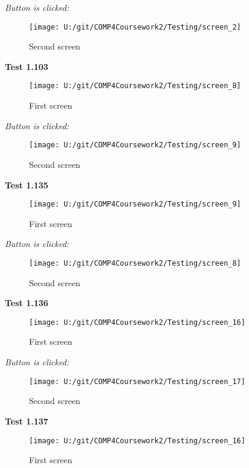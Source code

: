 \textit{Button is clicked: }

\begin{figure}[H]
    \label{fig: Second Screen}\caption{Second screen}
    \texttt{[image: U:/git/COMP4Coursework2/Testing/screen\_2]}
\end{figure}

\textbf{Test 1.103}

\begin{figure}[H]
    \label{fig: First Screen}\caption{First screen}
    \texttt{[image: U:/git/COMP4Coursework2/Testing/screen\_8]}
\end{figure}

\textit{Button is clicked: }

\begin{figure}[H]
    \label{fig: Second Screen}\caption{Second screen}
    \texttt{[image: U:/git/COMP4Coursework2/Testing/screen\_9]}
\end{figure}

\textbf{Test 1.135}

\begin{figure}[H]
    \label{fig: First Screen}\caption{First screen}
    \texttt{[image: U:/git/COMP4Coursework2/Testing/screen\_9]}
\end{figure}

\textit{Button is clicked: }

\begin{figure}[H]
    \label{fig: Second Screen}\caption{Second screen}
    \texttt{[image: U:/git/COMP4Coursework2/Testing/screen\_8]}
\end{figure}

\textbf{Test 1.136}

\begin{figure}[H]
    \label{fig: First Screen}\caption{First screen}
    \texttt{[image: U:/git/COMP4Coursework2/Testing/screen\_16]}
\end{figure}

\textit{Button is clicked: }

\begin{figure}[H]
    \label{fig: Second Screen}\caption{Second screen}
    \texttt{[image: U:/git/COMP4Coursework2/Testing/screen\_17]}
\end{figure}

\textbf{Test 1.137}

\begin{figure}[H]
    \label{fig: First Screen}\caption{First screen}
    \texttt{[image: U:/git/COMP4Coursework2/Testing/screen\_16]}
\end{figure}

